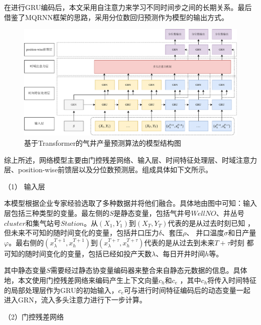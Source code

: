 在进行GRU编码后，本文采用自注意力来学习不同时间步之间的长期关系。最后借鉴了MQRNN框架\cite{wen2018multihorizon}的思路，采用分位数回归预测作为模型的输出方式。

\begin{figure}[H]
    \centering
    \includegraphics[width=.99\linewidth]{figure/基于Transformer的算法.vision.pdf}
    \caption{基于Transformer的气井产量预测算法的模型结构图}
    \label{fig:TFT}
\end{figure}

综上所述，网络模型主要由门控残差网络、输入层、时间特征处理层、时域注意力层、position-wise前馈层以及分位数预测层。组成具体如下文所示。

（1） 输入层

本模型根据企业专家经验选取了多种数据并将他们融合。具体地由图中可知：输入层包括三种类型的变量。最左侧的$S$是静态变量，包括气井号$WellNO$、井丛号$cluster$和集气站号$Station$。从$(X_1, Y_1)$到$(X_{T}, Y_{T})$代表的是从过去时刻已知
，但未来不可知的随时间变化的变量，包括井口压力\( \delta \)、套压\( \rho \)、
井口温度\( \sigma \)和日产量$\varphi $。最右侧的$(x^{T+1}_{\lambda }, x^{T+1}_{h })$到$(x^{T+\tau}_{\lambda }, x^{T+\tau}_{h})$代表的是从过去到未来$T+\tau$时刻
都可知的随时间变化的变量，包括已经如投产天数\( \lambda \)、每日开井时间$h$等。

其中静态变量$S$需要经过静态协变量编码器来整合来自静态元数据的信息。具体地，本文使用门控残差网络来编码产生上下文向量${c}_h$和${c}_e$
，其中${c}_h$将传入时间特征的局部处理层作为GRU的初始输入，${c}_e$可与进行时间特征编码后的动态变量一起进入GRN，流入多头注意力进行下一步计算。

（2）门控残差网络

